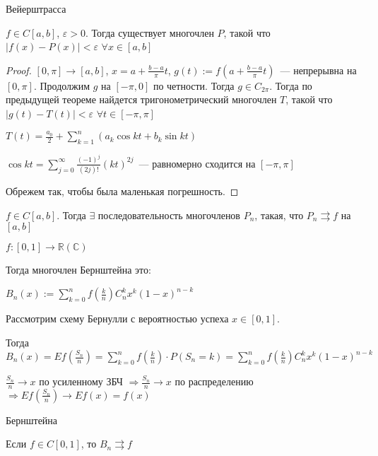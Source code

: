 \begin{theorem}
	Вейерштрасса
	
	$f \in C[a, b]$, $\varepsilon > 0$. Тогда существует многочлен $P$, такой что $|f(x) - P(x)| < \varepsilon$ $\forall x \in [a, b]$
\end{theorem}

\begin{proof}
	$[0, \pi] \rightarrow [a, b]$, $x = a + \frac{b - a}{\pi} t$, $g(t) := f(a + \frac{b - a}{\pi}t)$~--- непрерывна на $[0, \pi]$. Продолжим $g$ на $[-\pi, 0]$ по четности. Тогда $g \in C_{2\pi}$. Тогда по предыдущей теореме найдется тригонометрический многочлен $T$, такой что $|g(t) - T(t)| < \varepsilon$ $\forall t \in [-\pi, \pi]$
	
	$T(t) = \frac{a_0}{2} + \sum\limits_{k = 1}^{n} (a_k \cos kt + b_k \sin kt)$
	
	$\cos kt = \sum\limits_{j = 0}^{\infty} \frac{(-1)^j}{(2j)!}(kt)^{2j}$~--- равномерно сходится на $[-\pi, \pi]$
	
	Обрежем  так, чтобы была маленькая погрешность.	 
\end{proof}

\begin{consequence}
	$f \in C[a, b]$. Тогда $\exists$ последовательность многочленов $P_n$, такая, что $P_n \rightrightarrows f$ на $[a, b]$
\end{consequence}

\begin{definition}
	$f: [0, 1] \rightarrow \mathbb{R}(\mathbb{C})$ 
	
	Тогда многочлен Бернштейна это:
	
	$B_n(x) := \sum\limits_{k = 0}^n f(\frac{k}{n}) C_n^k x^k (1 - x)^{n-k}$
\end{definition}

\begin{observation}
	Рассмотрим схему Бернулли с вероятностью успеха $x \in [0, 1]$. 
	
	Тогда $B_n(x) = Ef(\frac{S_n}{n}) = \sum\limits_{k = 0}^n f(\frac{k}{n}) \cdot P(S_n = k) = \sum\limits_{k = 0}^n f(\frac{k}{n}) C_n^k x^k (1 - x)^{n-k}$
	
	$\frac{S_n}{n} \rightarrow x$ по усиленному ЗБЧ $\Rightarrow \frac{S_n}{n} \rightarrow x$ по распределению $\Rightarrow Ef(\frac{S_n}{n}) \rightarrow Ef(x) = f(x)$
\end{observation}

\begin{theorem}
	Бернштейна
	
	Если $f \in C[0, 1]$, то $B_n \rightrightarrows f$
\end{theorem}

